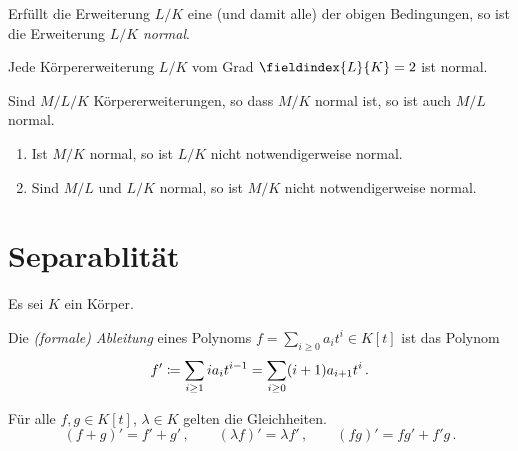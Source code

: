 \begin{definition}
  Erfüllt die Erweiterung $L/K$ eine \textup(und damit alle\textup) der obigen Bedingungen, so ist die Erweiterung $L/K$ \emph{normal}.
\end{definition}

\begin{example}
  Jede Körpererweiterung $L/K$ vom Grad $\fieldindex{L}{K} = 2$ ist normal.
\end{example}

\begin{lemma}
  Sind $M/L/K$ Körpererweiterungen, so dass $M/K$ normal ist, so ist auch $M/L$ normal.
\end{lemma}

\begin{warning}
  \begin{enumerate}
    \item
      Ist $M/K$ normal, so ist $L/K$ nicht notwendigerweise normal.
    \item
      Sind $M/L$ und $L/K$ normal, so ist $M/K$ nicht notwendigerweise normal.
  \end{enumerate}
\end{warning}










\pagebreak










\section{Separablität}

Es sei $K$ ein Körper.

\begin{definition}
  Die \emph{\textup(formale\textup) Ableitung} eines Polynoms $f = \sum_{i \geq 0} a_i t^i \in K[t]$ ist das Polynom
  \[
              f'
    \coloneqq  \sum_{i \geq 1} i a_i t^{i-1}
    =         \sum_{i \geq 0} (i+1) a_{i+1} t^i \,.
  \]
\end{definition}

\begin{lemma}
  Für alle $f, g \in K[t]$, $\lambda \in K$ gelten die Gleichheiten.
  \[
    (f + g)' = f' + g' \,,
    \qquad
    (\lambda f)' = \lambda f' \,,
    \qquad
    (fg)' = fg' + f'g \,.
  \]

\end{lemma}



